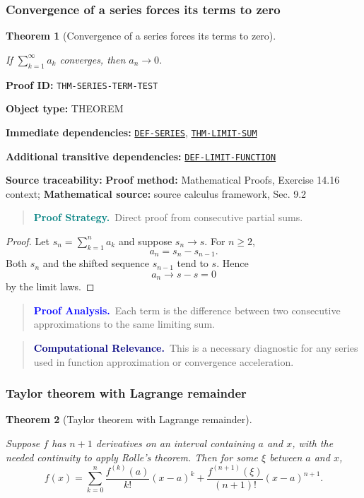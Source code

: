 \documentclass[10pt]{article}
\newcommand{\pidraw}[1]{\begingroup\urlstyle{tt}\nolinkurl{#1}\endgroup}
\newcommand{\pidref}[1]{\hyperref[prf:#1]{\pidraw{#1}}}
\newtheorem{theorem}{Theorem}[section]
\theoremstyle{definition}
\theoremstyle{remark}
\newenvironment{proofstrategy}
{\begin{quote}\small\noindent\textbf{\textcolor{teal}{Proof Strategy.}}\ }
{\end{quote}}
\newenvironment{proofanalysis}
{\begin{quote}\small\noindent\textbf{\textcolor{blue}{Proof Analysis.}}\ }
{\end{quote}}
\newenvironment{computationalrelevance}
{\begin{quote}\small\noindent\textbf{\textcolor{navy}{Computational Relevance.}}\ }
{\end{quote}}
\newcommand{\meta}[2]{\noindent\textbf{#1:} #2\par}
\begin{document}
\subsubsection{Convergence of a series forces its terms to zero}

\begin{theorem}[Convergence of a series forces its terms to zero]\label{prf:THM-SERIES-TERM-TEST}

If $\sum_{k=1}^{\infty}a_k$ converges, then $a_n\to0$.

\end{theorem}

\meta{Proof ID}{\pidraw{THM-SERIES-TERM-TEST}}
\meta{Object type}{THEOREM}
\meta{Immediate dependencies}{\pidref{DEF-SERIES}, \pidref{THM-LIMIT-SUM}}
\meta{Additional transitive dependencies}{\pidref{DEF-LIMIT-FUNCTION}}
\meta{Source traceability}{\textbf{Proof method:} Mathematical Proofs, Exercise 14.16 context; \textbf{Mathematical source:} source calculus framework, Sec. 9.2}

\begin{proofstrategy}Direct proof from consecutive partial sums.\end{proofstrategy}

\begin{proof}

Let $s_n=\sum_{k=1}^{n}a_k$ and suppose $s_n\to s$. For $n\ge2$,
\[
a_n=s_n-s_{n-1}.
\]
Both $s_n$ and the shifted sequence $s_{n-1}$ tend to $s$. Hence
\[
a_n\to s-s=0
\]
by the limit laws.

\end{proof}

\begin{proofanalysis}Each term is the difference between two consecutive approximations to the same limiting sum.\end{proofanalysis}

\begin{computationalrelevance}This is a necessary diagnostic for any series used in function approximation or convergence acceleration.\end{computationalrelevance}

\subsubsection{Taylor theorem with Lagrange remainder}

\begin{theorem}[Taylor theorem with Lagrange remainder]\label{prf:THM-TAYLOR-LAGRANGE}

Suppose $f$ has $n+1$ derivatives on an interval containing $a$ and $x$, with the needed continuity to apply Rolle's theorem. Then for some $\xi$ between $a$ and $x$,
\[
f(x)=\sum_{k=0}^{n}\frac{f^{(k)}(a)}{k!}(x-a)^k
+\frac{f^{(n+1)}(\xi)}{(n+1)!}(x-a)^{n+1}.
\]

\end{theorem}
\end{document}
